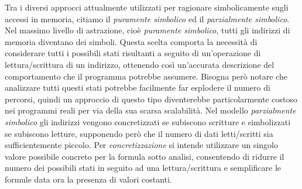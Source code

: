 \documentclass[Lau, oneside]{sapthesis}%
\begin{document}
Tra i diversi approcci attualmente utilizzati per ragionare simbolicamente sugli accessi in memoria, citiamo il \textit{puramente simbolico} ed il \textit{parzialmente simbolico}.
\newline \newline
Nel massimo livello di astrazione, cioè \textit{puramente simbolico}, tutti gli indirizzi di memoria diventano dei simboli.
\newline
Questa scelta comporta la necessità di considerare tutti i possibili stati risultanti a seguito di un'operazione di lettura/scrittura di un indirizzo, ottenendo così un'accurata descrizione del comportamento che il programma potrebbe assumere.
\newline
Bisogna però notare che analizzare tutti questi stati potrebbe facilmente far esplodere il numero di percorsi, quindi un approccio di questo tipo diventerebbe particolarmente costoso nei programmi reali per via della sua scarsa scalabilità.
\newline \newline
Nel modello \textit{parzialmente simbolico} gli indirizzi vengono concretizzati se subiscono scritture e simbolizzati se subiscono letture, supponendo però che il numero di dati letti/scritti sia sufficientemente piccolo.
\newline
Per \textit{concretizzazione} si intende utilizzare un singolo valore possibile concreto per la formula sotto analisi, consentendo di ridurre il numero dei possibili stati in seguito ad una lettura/scrittura e semplificare le formule data ora la presenza di valori costanti.
\end{document}
